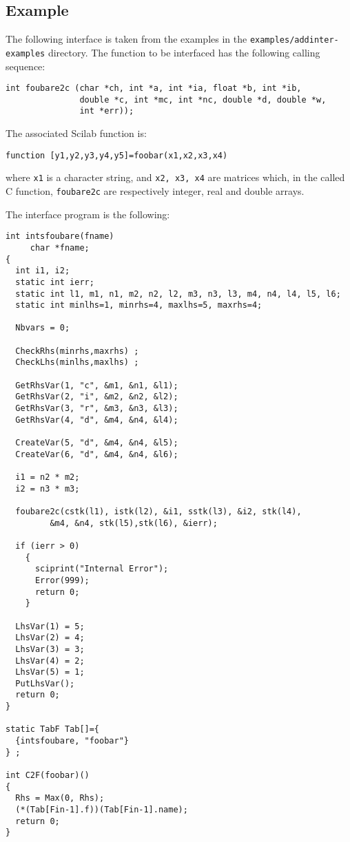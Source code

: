 \subsection{Example}

The following interface is taken from the examples in the 
{\tt examples/addinter-examples} directory.
The function to be interfaced has the following calling sequence:

\begin{verbatim}
int foubare2c (char *ch, int *a, int *ia, float *b, int *ib, 
               double *c, int *mc, int *nc, double *d, double *w, 
               int *err));
\end{verbatim}
The associated Scilab function is:
\begin{verbatim}
function [y1,y2,y3,y4,y5]=foobar(x1,x2,x3,x4)
\end{verbatim}
where {\tt x1} is a character string, and {\tt x2, x3, x4} are
matrices which, in the called C function, {\tt foubare2c} are
respectively integer, real and double arrays.

\medskip
\noindent
The interface program is the following:
\scriptsize
\begin{verbatim}
int intsfoubare(fname) 
     char *fname;
{
  int i1, i2;
  static int ierr;
  static int l1, m1, n1, m2, n2, l2, m3, n3, l3, m4, n4, l4, l5, l6;
  static int minlhs=1, minrhs=4, maxlhs=5, maxrhs=4;

  Nbvars = 0;
  
  CheckRhs(minrhs,maxrhs) ;
  CheckLhs(minlhs,maxlhs) ;

  GetRhsVar(1, "c", &m1, &n1, &l1);
  GetRhsVar(2, "i", &m2, &n2, &l2);
  GetRhsVar(3, "r", &m3, &n3, &l3);
  GetRhsVar(4, "d", &m4, &n4, &l4);
  
  CreateVar(5, "d", &m4, &n4, &l5);
  CreateVar(6, "d", &m4, &n4, &l6);

  i1 = n2 * m2;
  i2 = n3 * m3;
  
  foubare2c(cstk(l1), istk(l2), &i1, sstk(l3), &i2, stk(l4), 
	     &m4, &n4, stk(l5),stk(l6), &ierr);
  
  if (ierr > 0) 
    {
      sciprint("Internal Error");
      Error(999);
      return 0;
    }
  
  LhsVar(1) = 5;
  LhsVar(2) = 4;
  LhsVar(3) = 3;
  LhsVar(4) = 2;
  LhsVar(5) = 1;
  PutLhsVar();
  return 0;
}

static TabF Tab[]={ 
  {intsfoubare, "foobar"} 
} ; 

int C2F(foobar)()
{
  Rhs = Max(0, Rhs);
  (*(Tab[Fin-1].f))(Tab[Fin-1].name);
  return 0;
} 
\end{verbatim}
\normalsize

